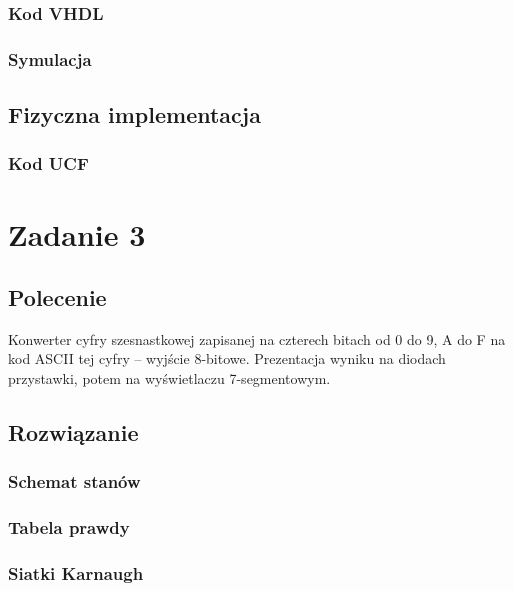 \documentclass[a4paper,12pt]{extarticle}  %
\begin{document}
\subsubsection{Kod VHDL}

\subsubsection{Symulacja}
\begin{figure}[H]
	\centering
\end{figure}
\subsection{Fizyczna implementacja}
\subsubsection{Kod UCF}

\section{Zadanie 3}
\subsection{Polecenie}
Konwerter cyfry szesnastkowej zapisanej na czterech bitach od 0 do 9, A do F 
na kod ASCII tej cyfry – wyjście 8-bitowe. Prezentacja wyniku na diodach 
przystawki, potem na wyświetlaczu 7-segmentowym. 
\subsection{Rozwiązanie}
\subsubsection{Schemat stanów}
\subsubsection{Tabela prawdy}
\subsubsection{Siatki Karnaugh}
\end{document}
